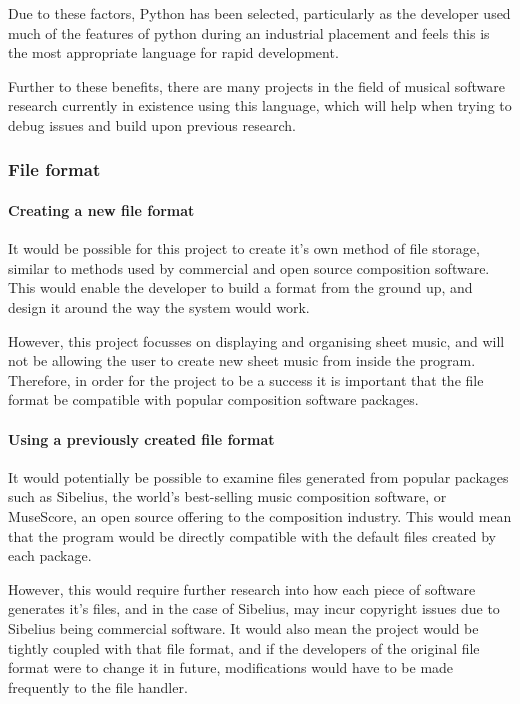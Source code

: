 Due to these factors, Python has been selected, particularly as the developer used much of the features of python during an industrial placement and feels this is the most appropriate language for rapid development.

Further to these benefits, there are many projects in the field of musical software research currently in existence using this language, \parencite{pmus} which will help when trying to debug issues and build upon previous research.

\subsubsection{File format}
\paragraph{Creating a new file format}

It would be possible for this project to create it's own method of file storage, similar to methods used by commercial and open source composition software. This would enable the developer to build a format from the ground up, and design it around the way the system would work.

However, this project focusses on displaying and organising sheet music, and will not be allowing the user to create new sheet music from inside the program. Therefore, in order for the project to be a success it is important that the file format be compatible with popular composition software packages.

\paragraph{Using a previously created file format}

It would potentially be possible to examine files generated from popular packages such as Sibelius, the world's best-selling music composition software, \parencite{avid} or MuseScore, an open source offering to the composition industry. This would mean that the program would be directly compatible with the default files created by each package.

However, this would require further research into how each piece of software generates it's files, and in the case of Sibelius, may incur copyright issues due to Sibelius being commercial software. It would also mean the project would be tightly coupled with that file format, and if the developers of the original file format were to change it in future, modifications would have to be made frequently to the file handler.

